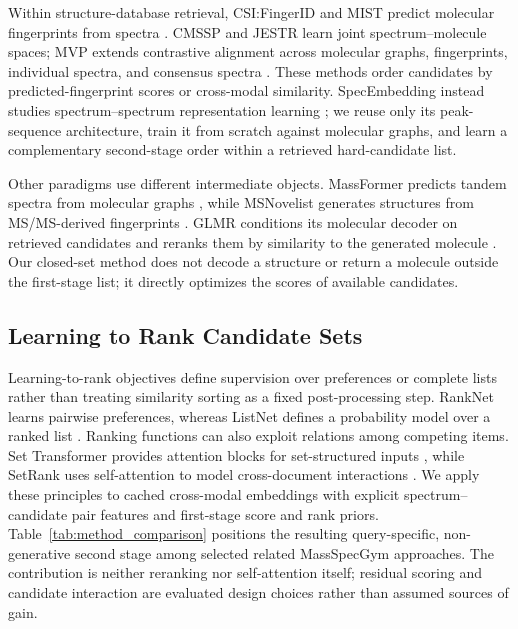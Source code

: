 \documentclass[runningheads]{llncs}
\begin{document}
Within structure-database retrieval, CSI:FingerID and MIST predict molecular
fingerprints from spectra \cite{duhrkop2015csifingerid,goldman2023mist}.
CMSSP and JESTR learn joint spectrum--molecule spaces; MVP extends contrastive
alignment across molecular graphs, fingerprints, individual spectra, and
consensus spectra \cite{chen2024cmssp,kalia2025jestr,chen2026mvp}. These methods
order candidates by predicted-fingerprint scores or cross-modal similarity.
SpecEmbedding instead studies spectrum--spectrum representation learning
\cite{xiong2025specembedding}; we reuse only its peak-sequence architecture,
train it from scratch against molecular graphs, and learn a complementary
second-stage order within a retrieved hard-candidate list.

Other paradigms use different intermediate objects. MassFormer predicts tandem
spectra from molecular graphs \cite{young2024massformer}, while MSNovelist
generates structures from MS/MS-derived fingerprints
\cite{stravs2022msnovelist}. GLMR conditions its molecular decoder on retrieved
candidates and reranks them by similarity to the generated molecule
\cite{zhang2026glmr}. Our closed-set method does not decode a structure or
return a molecule outside the first-stage list; it directly optimizes the
scores of available candidates.

\subsection{Learning to Rank Candidate Sets}

Learning-to-rank objectives define supervision over preferences or complete
lists rather than treating similarity sorting as a fixed post-processing step.
RankNet learns pairwise preferences, whereas ListNet defines a probability
model over a ranked list \cite{burges2005ranknet,cao2007listnet}. Ranking
functions can also exploit relations among competing items. Set Transformer
provides attention blocks for set-structured inputs
\cite{lee2019settransformer}, while SetRank uses self-attention to model
cross-document interactions \cite{pang2020setrank}. We apply these principles
to cached cross-modal embeddings with explicit spectrum--candidate pair
features and first-stage score and rank priors. Table~\ref{tab:method_comparison}
positions the resulting query-specific, non-generative second stage among
selected related MassSpecGym approaches. The contribution is neither reranking
nor self-attention itself; residual scoring and candidate interaction are
evaluated design choices rather than assumed sources of gain.
\end{document}
